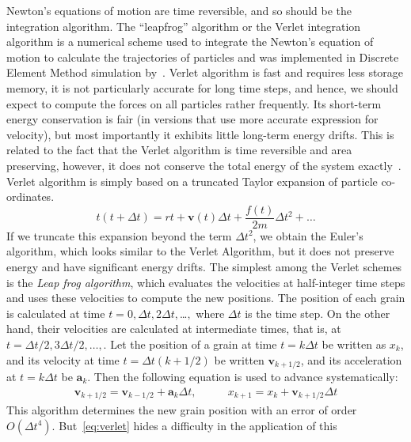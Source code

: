 Newton's equations of motion are time reversible, and so should be the 
integration algorithm. The 
``leapfrog'' algorithm or the Verlet integration algorithm is a numerical 
scheme used to integrate 
the Newton's equation of motion to calculate the trajectories of particles and 
was implemented in 
Discrete Element Method simulation by~\citet{Verlet1967}. Verlet algorithm is 
fast and requires 
less 
storage memory, it is not particularly accurate for long time steps, and 
hence, we should expect 
to 
compute the forces on all particles rather frequently. Its short-term energy 
conservation is fair 
(in versions that use more accurate expression for velocity), but most 
importantly it exhibits 
little long-term energy drifts. This is related to the fact that the Verlet 
algorithm is time 
reversible and area preserving, however, it does not conserve the total energy 
of the system 
exactly~\citep{Daan1996}. Verlet algorithm is simply based on a truncated 
Taylor expansion of 
particle co-ordinates. 
\begin{equation}
t(t+\Delta t)=r{t} +\mathbf{v}(t) \Delta t + \frac{f(t)}{2\mathit{m}} \Delta 
t^{2}+ \dots
\end{equation}
If we truncate this expansion beyond the term $\Delta t^{2}$, we obtain the 
Euler's algorithm, 
which looks similar to the Verlet Algorithm, but it does not preserve energy 
and have significant 
energy drifts. The simplest among the Verlet schemes is the \textit{Leap frog 
algorithm}, which 
evaluates the velocities at half-integer time steps and uses these velocities 
to compute the new 
positions. The position of each grain is calculated at time $t=0, \Delta t, 
2\Delta t, $\dots$ ,$ 
where $\Delta t$ is the time step. On the other hand, their velocities are 
calculated at 
intermediate times, that is, at $t=\Delta t/2, 3 \Delta t/2, \dots,$. Let the 
position of a grain 
at time $t=k\Delta t$ be written as $x_{\mathit{k}}$, and its velocity at time 
$t=\Delta t (k + 
1/2)$ be written $\mathbf{v}_{\mathit{k + 1/2}}$, and its acceleration at $t=k 
\Delta t$ be 
$\mathbf{a}_{\mathit{k}}$. Then the following equation is used to advance 
systematically:
%
\begin{align}\label{eq:verlet}
\mathbf{v}_{\mathit{k}+1/2}=\mathbf{v}_{\mathit{k}-1/2}+\mathbf{a}_{\mathit{k}}
 \Delta t, \qquad & 
x_{\mathit{k}+1}=x_{\mathit{k}}+\mathbf{v}_{\mathit{k}+1/2} \Delta t
\end{align}
%
This algorithm determines the new grain position with an error of order 
$\mathit{O}( \Delta 
t^{4})$. But~\cref{eq:verlet} hides a difficulty in the application of this 
